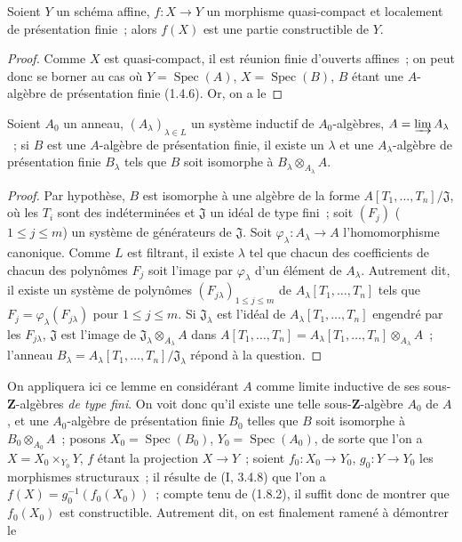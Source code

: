 \begin{lemma}[1.8.4.1]
\label{IV.1.8.4.1-fr}
Soient $Y$ un schéma affine, $f:X\to Y$ un morphisme quasi-compact et
localement de présentation finie~; alors $f(X)$ est une partie constructible
de $Y$.
\end{lemma}

\begin{proof}
Comme $X$ est quasi-compact, il est réunion finie d'ouverts affines~; on peut
donc se borner au cas où $Y=\operatorname{Spec}(A)$,
$X=\operatorname{Spec}(B)$, $B$ étant une $A$-algèbre de présentation finie
(1.4.6). Or, on a le
\end{proof}

\begin{lemma}[1.8.4.2]
\label{IV.1.8.4.2-fr}
Soient $A_0$ un anneau, $(A_\lambda)_{\lambda\in L}$ un système inductif de
$A_0$-algèbres, $A=\varinjlim A_\lambda$~; si $B$ est une $A$-algèbre de
présentation finie, il existe un $\lambda$ et une $A_\lambda$-algèbre de
présentation finie $B_\lambda$ tels que $B$ soit isomorphe à
$B_\lambda\otimes_{A_\lambda}A$.
\end{lemma}

\begin{proof}
Par hypothèse, $B$ est isomorphe à une algèbre de la forme
$A[T_1,\ldots,T_n]/\mathfrak J$, où les $T_i$ sont des indéterminées et
$\mathfrak J$ un idéal de type fini~; soit $(F_j)$ ($1\leq j\leq m$) un
système de générateurs de $\mathfrak J$. Soit
$\varphi_\lambda:A_\lambda\to A$ l'homomorphisme canonique. Comme $L$ est
filtrant, il existe $\lambda$ tel que chacun des coefficients de chacun des
polynômes $F_j$ soit l'image par $\varphi_\lambda$ d'un élément de
$A_\lambda$. Autrement dit, il existe un système de polynômes
$(F_{j\lambda})_{1\leq j\leq m}$ de $A_\lambda[T_1,\ldots,T_n]$ tels que
$F_j=\varphi_\lambda(F_{j\lambda})$ pour $1\leq j\leq m$. Si
$\mathfrak J_\lambda$ est l'idéal de $A_\lambda[T_1,\ldots,T_n]$ engendré
par les $F_{j\lambda}$, $\mathfrak J$ est l'image de
$\mathfrak J_\lambda\otimes_{A_\lambda}A$ dans
$A[T_1,\ldots,T_n]=A_\lambda[T_1,\ldots,T_n]\otimes_{A_\lambda}A$~;
l'anneau $B_\lambda=A_\lambda[T_1,\ldots,T_n]/\mathfrak J_\lambda$ répond à
la question.
\end{proof}

On appliquera ici ce lemme en considérant $A$ comme limite inductive de ses
sous-$\mathbf Z$-algèbres \emph{de type fini}. On voit donc qu'il existe une
telle sous-$\mathbf Z$-algèbre $A_0$ de $A$, et une $A_0$-algèbre de
présentation finie $B_0$ telles que $B$ soit isomorphe à
$B_0\otimes_{A_0}A$~; posons $X_0=\operatorname{Spec}(B_0)$,
$Y_0=\operatorname{Spec}(A_0)$, de sorte que l'on a $X=X_0\times_{Y_0}Y$,
$f$ étant la projection $X\to Y$~; soient $f_0:X_0\to Y_0$,
$g_0:Y\to Y_0$ les morphismes structuraux~; il résulte de (I, 3.4.8) que
l'on a $f(X)=g_0^{-1}(f_0(X_0))$~; compte tenu de (1.8.2), il suffit donc de
montrer que $f_0(X_0)$ est constructible. Autrement dit, on est finalement
ramené à démontrer le

